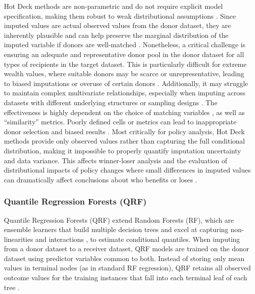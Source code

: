 Hot Deck methods are non-parametric and do not require explicit model specification, making them robust to weak distributional assumptions \citep{dorazio2021statistical}. Since imputed values are actual observed values from the donor dataset, they are inherently plausible and can help preserve the marginal distribution of the imputed variable if donors are well-matched \citep{andridge2010review}. Nonetheless, a critical challenge is ensuring an adequate and representative donor pool in the donor dataset for all types of recipients in the target dataset. This is particularly difficult for extreme wealth values, where suitable donors may be scarce or unrepresentative, leading to biased imputations or overuse of certain donors \citep{haziza2009imputation}. Additionally, it may struggle to maintain complex multivariate relationships, especially when imputing across datasets with different underlying structures or sampling designs \citep{siddique2008multiple}. The effectiveness is highly dependent on the choice of matching variables \citep{ota2012revenue}, as well as “similarity” metrics. Poorly defined cells or metrics can lead to inappropriate donor selection and biased results \citep{andridge2010review}. Most critically for policy analysis, Hot Deck methods provide only observed values rather than capturing the full conditional distribution, making it impossible to properly quantify imputation uncertainty and data variance. This affects winner-loser analysis and the evaluation of distributional impacts of policy changes where small differences in imputed values can dramatically affect conclusions about who benefits or loses \citep{rubin1987multiple}.

\subsubsection{Quantile Regression Forests (QRF)}

Quantile Regression Forests (QRF) \citep{meinshausen2006quantile} extend Random Forests (RF), which are ensemble learners that build multiple decision trees and excel at capturing non-linearities and interactions \citep{breiman2001random}, to estimate conditional quantiles. When imputing from a donor dataset to a receiver dataset, QRF models are trained on the donor dataset using predictor variables common to both. Instead of storing only mean values in terminal nodes (as in standard RF regression), QRF retains all observed outcome values for the training instances that fall into each terminal leaf of each tree \citep{meinshausen2006quantile}. 

